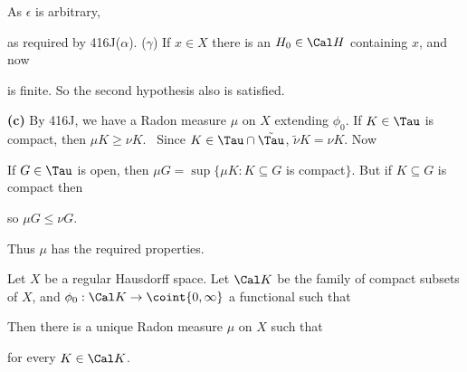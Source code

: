 {\noindent As $\epsilon$ is arbitrary,


\noindent as required by 416J($\alpha$).   ($\gamma$) If $x\in X$ there is
an $H_0\in\Cal H$ containing $x$, and now


\noindent is finite.   So the second hypothesis also is satisfied.\ \Qed

\medskip

{\bf (c)} By 416J, we have a Radon measure $\mu$ on $X$ extending $\phi_0$.
If $K\in\Tau$ is compact, then $\mu K\ge\nu K$.   \Prf\ Since
$K\in\Tau\cap\tilde\Tau$, $\tilde\nu K=\nu K$.   Now


\noindent If $G\in\Tau$ is open, then
$\mu G=\sup\{\mu K:K\subseteq G$ is compact$\}$.   But if $K\subseteq G$ is
compact then


\noindent so $\mu G\le\nu G$.

Thus $\mu$ has the required properties.
}%

 Let $X$ be a regular Hausdorff space.   Let
$\Cal K$ be the family of compact subsets of $X$, and
$\phi_0:\Cal K\to\coint{0,\infty}$ a functional such that




\noindent Then there is a unique Radon measure $\mu$ on $X$ such that


\noindent for every $K\in\Cal K$.

